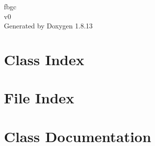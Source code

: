 \documentclass[twoside]{book}
\newcommand{\+}{\discretionary{\mbox{\scriptsize$\hookleftarrow$}}{}{}}
\newcommand{\clearemptydoublepage}{%
  \newpage{\pagestyle{empty}\cleardoublepage}%
}
\begin{document}
\hypersetup{pageanchor=false,
             bookmarksnumbered=true,
             pdfencoding=unicode
            }
\begin{titlepage}
\vspace*{7cm}
\begin{center}%
{\Large fbgc \\[1ex]\large v0 }\\
\vspace*{1cm}
{\large Generated by Doxygen 1.8.13}\\
\end{center}
\end{titlepage}
\clearemptydoublepage
{}
\tableofcontents
\clearemptydoublepage
{}
\hypersetup{pageanchor=true}

\chapter{Class Index}

\chapter{File Index}

\chapter{Class Documentation}





































\end{document}
